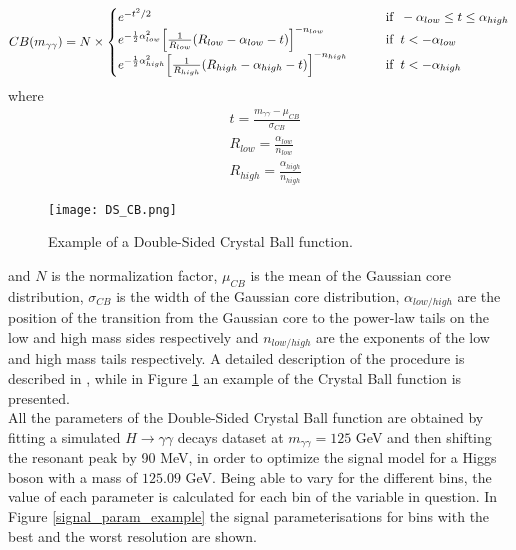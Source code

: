 \begin{equation}
CB(m_{\gamma\gamma}) = N \times \begin{cases}
									e^{-t^2/2} \hspace{4cm} &\text{if} \hspace{0.2cm} -\alpha_{low} \leq t \leq \alpha_{high} \\
									e^{-\frac{1}{2}\alpha_{low}^2}\Bigl[\frac{1}{R_{low}}(R_{low} - \alpha_{low} - t)\Bigr]^{-n_{low}} \hspace{1cm} &\text{if} \hspace{0.2cm} t < -\alpha_{low} \\
									e^{-\frac{1}{2}\alpha_{high}^2}\Bigl[\frac{1}{R_{high}}(R_{high} - \alpha_{high} - t)\Bigr]^{-n_{high}} \hspace{0.7cm} &\text{if} \hspace{0.2cm} t < -\alpha_{high}
									\end{cases}							
\end{equation}
where
\begin{align}
&t = \frac{m_{\gamma\gamma} - \mu_{CB}}{\sigma_{CB}} \\
&R_{low} = \frac{\alpha_{low}}{n_{low}} \\
&R_{high} = \frac{\alpha_{high}}{n_{high}}
\end{align}
\begin{figure}[htb]
\centering
\texttt{[image: DS\_CB.png]}
\caption{Example of a Double-Sided Crystal Ball function.}
\label{CB_example}
\end{figure}
and $N$ is the normalization factor, $\mu_{CB}$ is the mean of the Gaussian core distribution, $\sigma_{CB}$ is the width of the Gaussian core distribution, $\alpha_{low/high}$ are the position of the transition from the Gaussian core to the power-law tails on the low and high mass sides respectively and $n_{low/high}$ are the exponents of the low and high mass tails respectively. A detailed description of the procedure is described in \cite{Min_2309522}, while in Figure \ref{CB_example} an example of the Crystal Ball function is presented. 
\\
All the parameters of the Double-Sided Crystal Ball function are obtained by fitting a simulated $H \rightarrow \gamma\gamma$ decays dataset at $m_{\gamma\gamma} = 125$ GeV and then shifting the resonant peak by 90 MeV, in order to optimize the signal model for a Higgs boson with a mass of $125.09$ GeV. Being able to vary for the different bins, the value of each parameter is calculated for each bin of the variable in question. In Figure \ref{signal_param_example} the signal parameterisations for bins with the best and the worst resolution are shown. 

